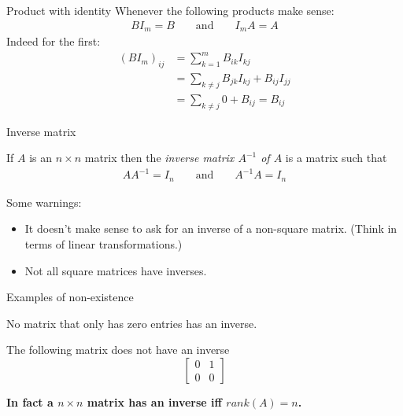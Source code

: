 \documentclass{beamer}
\begin{document}
\begin{frame}{Product with identity}
  Whenever the following products make sense:
  \begin{align*}
    BI_m = B & & \text{ and } & & I_mA = A
  \end{align*}
  Indeed for the first:
  \begin{align*}
    (BI_m)_{ij} &= \sum_{k=1}^mB_{ik}I_{kj}\\
                &= \sum_{k\neq j}B_{jk}I_{kj} + B_{ij}I_{jj}\\
                &= \sum_{k\neq j}0 + B_{ij} = B_{ij}
  \end{align*}
\end{frame}

\begin{frame}{Inverse matrix}
  \begin{definition}
    If $A$ is an $n\times n$ matrix then the \emph{inverse matrix $A^{-1}$ of $A$} is a matrix such that
    \begin{align*}
     AA^{-1} = I_n & & \text{ and } & & A^{-1}A = I_n
    \end{align*}
  \end{definition}\vfill
  {\color{red}Some warnings:}
  \begin{itemize}
  \item It doesn't make sense to ask for an inverse of a non-square matrix.
    (Think in terms of linear transformations.)
  \item Not all square matrices have inverses.
  \end{itemize}
\end{frame}

\begin{frame}{Examples of non-existence}
  \begin{example}
    No matrix that only has zero entries has an inverse.
  \end{example}
  \begin{example}
    The following matrix does not have an inverse
    \begin{equation*}
      \left[
	\begin{array}{cc}
          0 & 1 \\
          0 & 0
	\end{array}
      \right]
    \end{equation*}
  \end{example}
  \bf{In fact a $n\times n$ matrix has an inverse iff $rank(A)=n$.}
\end{frame}
\end{document}
